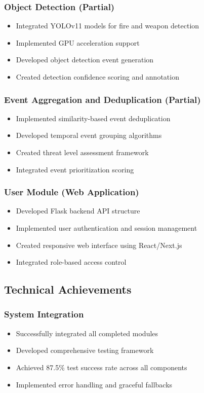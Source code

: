 \documentclass[12pt,a4paper]{article}
\begin{document}
\subsubsection{Object Detection (Partial)}
\begin{itemize}
    \item Integrated YOLOv11 models for fire and weapon detection
    \item Implemented GPU acceleration support
    \item Developed object detection event generation
    \item Created detection confidence scoring and annotation
\end{itemize}

\subsubsection{Event Aggregation and Deduplication (Partial)}
\begin{itemize}
    \item Implemented similarity-based event deduplication
    \item Developed temporal event grouping algorithms
    \item Created threat level assessment framework
    \item Integrated event prioritization scoring
\end{itemize}

\subsubsection{User Module (Web Application)}
\begin{itemize}
    \item Developed Flask backend API structure
    \item Implemented user authentication and session management
    \item Created responsive web interface using React/Next.js
    \item Integrated role-based access control
\end{itemize}

\subsection{Technical Achievements}

\subsubsection{System Integration}
\begin{itemize}
    \item Successfully integrated all completed modules
    \item Developed comprehensive testing framework
    \item Achieved 87.5\% test success rate across all components
    \item Implemented error handling and graceful fallbacks
\end{itemize}
\end{document}

